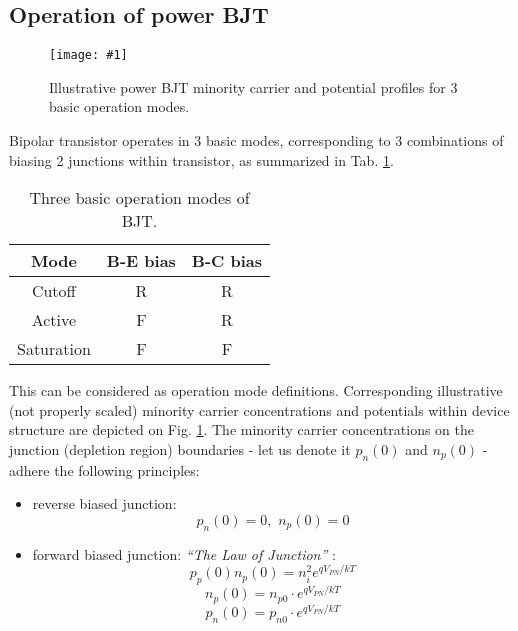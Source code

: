 \documentclass[conference]{IEEEtran}
\newcommand{\myfig}[3]
{
    \begin{figure}[!ht]
	\centering
	\texttt{[image: \#1]}
	\caption{#2}
	#3
    \end{figure}
}
\begin{document}
\subsection{Operation of power BJT} \label{sec:rezimy1}

\myfig{rezimy1}{Illustrative power BJT minority carrier and potential profiles for 3 basic operation modes.}{\label{fig:rezimy1}}
Bipolar transistor operates in 3 basic modes, corresponding to 3 combinations of biasing 2 junctions within transistor, as summarized in Tab. \ref{tab:rezimy}.
\begin{table}[h]
    \centering
    \begin{tabular}{c c c}
	\hline
	Mode 		& B-E bias	 & B-C bias\\
	\hline
	Cutoff		& R		& R \\
	Active		& F 		& R \\
	Saturation 	& F		& F \\
    \end{tabular}
    \caption{Three basic operation modes of BJT.}
    \label{tab:rezimy}
\end{table}
This can be considered as operation mode definitions. Corresponding illustrative (not properly scaled) minority carrier concentrations and potentials within device structure are depicted on Fig. \ref{fig:rezimy1}. The minority carrier concentrations on the junction (depletion region) boundaries - let us denote it $p_n(0)$ and $n_p(0)$ - adhere the following principles:
\begin{itemize}
    \item reverse biased junction: 
	\begin{equation}
	    p_n(0) = 0 \mathrm{,}\,\, n_p(0) = 0
	    \label{eq:reverse_bias}
	\end{equation}
    \item forward biased junction: \textit{``The Law of Junction''} \cite{pierret}: 
	\begin{equation}
	    p_p(0) n_p(0) = n_i^2 e^{q V_{PN}/kT}
	    \label{eq:law_of_junction}
	\end{equation}
	\begin{equation}
	    n_p(0) = n_{p0} \cdot e^{q V_{PN}/kT}
	    \label{eq:law_of_junction_np}
	\end{equation}
	\begin{equation}
	    p_n(0) = p_{n0} \cdot e^{q V_{PN}/kT}
	    \label{eq:law_of_junction_pn}
	\end{equation}
\end{itemize}
\end{document}

